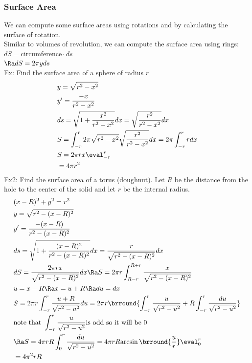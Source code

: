 \subsubsection{Surface Area}
We can compute some surface areas using rotations and by calculating the surface of rotation.\\
Similar to volumes of revolution, we can compute the surface area using rings: ${dS=\text{circumference}\cdot ds}$\\
$\Ra dS=2\pi y ds$\\
Ex: Find the surface area of a sphere of radius $r$
\begin{align*}
    &y=\sqrt{r^2-x^2}\\
    &y'=\frac{-x}{r^2-x^2}\\
    &ds=\sqrt{1+\frac{x^2}{r^2-x^2}}dx=\sqrt{\frac{r^2}{r^2-x^2}}dx\\
    &S=\int_{-r}^r2\pi\sqrt{r^2-x^2}\sqrt{\frac{r^2}{r^2-x^2}}dx=2\pi\int_{-r}^r rdx\\
    &S={2\pi rx}\eval_{-r}^r\\
    &=4\pi r^2
\end{align*}
Ex2: Find the surface area of a torus (doughnut). Let $R$ be the distance from the hole to the center of the solid and let $r$ be the internal radius.
\begin{align*}
    &(x-R)^2+y^2=r^2\\
    &y=\sqrt{r^2-(x-R)^2}\\
    &y'=\frac{-(x-R)}{r^2-(x-R)^2}\\
    &ds=\sqrt{1+\frac{(x-R)^2}{r^2-(x-R)^2}}dx=\frac{r}{\sqrt{r^2-(x-R)^2}}dx\\
    &dS=\frac{2\pi rx}{\sqrt{r^2-(x-R)^2}}dx\Ra S=2\pi r\int_{R-r}^{R+r}\frac{x}{\sqrt{r^2-(x-R)^2}}\\
    &u=x-R\Ra x=u+R\Ra du=dx\\
    &S=2\pi r\int_{-r}^r\frac{u+R}{\sqrt{r^2-u^2}}du=2\pi r\brround{\int_{-r}^r\frac{u}{\sqrt{r^2-u^2}}+R\int_{-r}^r\frac{du}{\sqrt{r^2-u^2}}}\\
    &\text{note that }\int_{-r}^r\frac{u}{\sqrt{r^2-u^2}}\text{is odd so it will be 0}\\
    &\Ra S=4\pi rR\int_{0}^r\frac{du}{\sqrt{r^2-u^2}}=4\pi rR{\arcsin\brround{\frac{u}{r}}}\eval_0^r\\
    &=4\pi^2rR
\end{align*}

